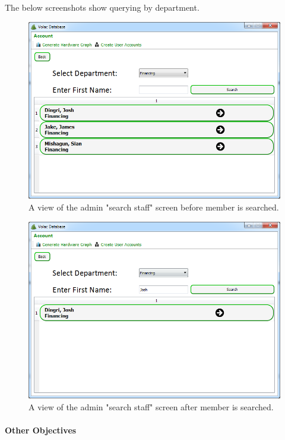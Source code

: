 The below screenshots show querying by department.

\begin{figure}[H]
    \includegraphics[width=\textwidth]{./Evaluation/Images/beforeadv.png}
    \caption{A view of the admin "search staff" screen before member is searched.} 
\end{figure}

\begin{figure}[H]
    \includegraphics[width=\textwidth]{./Evaluation/Images/afteradv.png}
    \caption{A view of the admin "search staff" screen after member is searched.} 
\end{figure}



\paragraph{Other Objectives}

